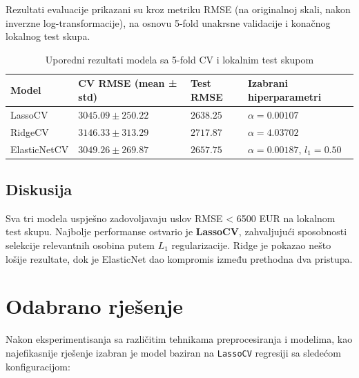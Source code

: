 \documentclass[a4paper,12pt]{article}
\begin{document}
Rezultati evaluacije prikazani su kroz metriku RMSE (na originalnoj skali, nakon inverzne log-transformacije), na osnovu 5-fold unakrsne validacije i konačnog lokalnog test skupa.

\begin{table}[H]
\centering
\caption{Uporedni rezultati modela sa 5-fold CV i lokalnim test skupom}
\label{tab:modeli}
\begin{tabularx}{\textwidth}{l >{\centering\arraybackslash}X >{\centering\arraybackslash}X >{\centering\arraybackslash}X}
\toprule
\textbf{Model} & \textbf{CV RMSE (mean ± std)} & \textbf{Test RMSE} & \textbf{Izabrani hiperparametri} \\
\midrule
LassoCV & $3045.09 \pm 250.22$ & $2638.25$ & $\alpha = 0.00107$ \\
RidgeCV & $3146.33 \pm 313.29$ & $2717.87$ & $\alpha = 4.03702$ \\
ElasticNetCV & $3049.26 \pm 269.87$ & $2657.75$ & $\alpha = 0.00187$, $l_1 = 0.50$ \\
\bottomrule
\end{tabularx}
\end{table}

\subsection{Diskusija}

Sva tri modela uspješno zadovoljavaju uslov RMSE < 6500 EUR na lokalnom  test skupu. Najbolje performanse ostvario je \textbf{LassoCV}, zahvaljujući sposobnosti selekcije relevantnih osobina putem $L_1$ regularizacije. Ridge je pokazao nešto lošije rezultate, dok je ElasticNet dao kompromis između prethodna dva pristupa.

\section{Odabrano rješenje}

Nakon eksperimentisanja sa različitim tehnikama preprocesiranja i modelima, kao najefikasnije rješenje izabran je model baziran na \texttt{LassoCV} regresiji sa sledećom konfiguracijom:
\end{document}
